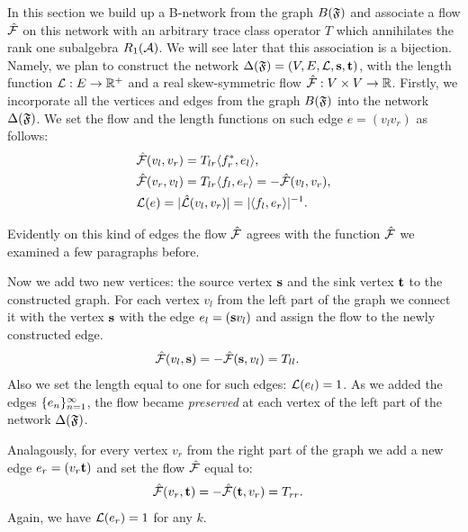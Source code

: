 \documentclass[12pt]{amsart}
\begin{document}
    In this section we build up a B-network from the graph $B(\fsys)$ and associate a flow $\flow$ on this network with 
      an arbitrary trace class operator $T$ which annihilates the rank one subalgebra $R_1(\cal{A})$.
    We will see later that this association is a bijection.
    Namely, we plan to construct the network $\net(\fsys) = (V, E, \len, \source, \sink)$,
      with the length function $\len: E \to \mathbb{R}^{+}$ and a real skew-symmetric flow $\flow: V \times V \to \mathbb{R}$.
    Firstly, we incorporate all the vertices and edges from the graph $B(\fsys)$ into the network $\net(\fsys)$.
    We set the flow and the length functions on such edge $e = (v_l v_r)$ as follows:
    \begin{align*}
      &\flow(v_l, v_r) = T_{lr} \inner{f^*_r}{e_l},\\
      &\flow(v_r, v_l) = T_{lr} \inner{f_l}{e_r} = -\flow(v_l, v_r),\\
      &\len(e) = \lvert \wt(v_l, v_r) \rvert =  \lvert\inner{f_l}{e_r}\rvert^{-1}.
    \end{align*}
    \begin{remark}
      Evidently on this kind of edges the flow $\flow$ agrees with the function $\flowsgn$
        we examined a few paragraphs before.
    \end{remark}

    Now we add two new vertices: the source vertex $\source$ and the sink vertex $\sink$ to the constructed graph.
    For each vertex $v_l$ from the left part of the graph we connect it with the vertex $\source$ with the edge $e_l = (\source v_l)$
      and assign the flow to the newly constructed edge.
    \begin{align*}
      &\flow(v_l, \source) = -\flow(\source, v_l) = T_{ll}.
    \end{align*}
    Also we set the length equal to one for such edges: $\len(e_l) = 1$.
    As we added the edges $\seq{e}$, the flow became \emph{preserved} at each vertex of the left part of the network $\net(\fsys)$.

    Analagously, for every vertex $v_r$ from the right part of the graph we add a new edge $e_r=(v_r \sink)$
      and set the flow $\flow$ equal to:
    \begin{align*}
      &\flow(v_r, \sink) = -\flow(\sink, v_r) =  T_{rr}.
    \end{align*}
    Again, we have $\len(e_r) = 1$ for any $k$.
\end{document}
